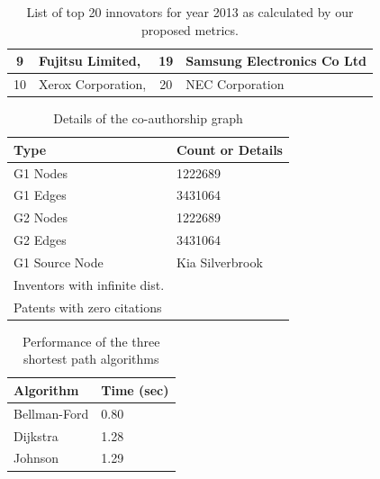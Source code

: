 \begin{table}[t]
\begin{tabular}{clcl}
\multicolumn{1}{|c|}{9}             & \multicolumn{1}{l|}{Fujitsu Limited,}                            & \multicolumn{1}{c|}{19}            & \multicolumn{1}{l|}{Samsung Electronics Co Ltd}                \\ \hline
\multicolumn{1}{|c|}{10}            & \multicolumn{1}{l|}{Xerox Corporation,}                          & \multicolumn{1}{c|}{20}            & \multicolumn{1}{l|}{NEC Corporation}                           \\ \hline                                                               
\end{tabular}
\caption{List of top 20 innovators for year 2013 as calculated by our proposed metrics.}
\label{lst:top20}
\end{table}


\begin{table}[t]
		\begin{tabular}{| l | l |}
		\hline
		
		{Type} & {Count or Details} \\
		\hline
		\hline
		G1 Nodes & 1222689 \\
		G1 Edges & 3431064 \\
		G2 Nodes & 1222689 \\
		G2 Edges & 3431064 \\
		G1 Source Node & Kia Silverbrook \\
		Inventors with infinite dist. & \\
		Patents with zero citations & \\
		\hline
	\end{tabular}		
	\caption {\scriptsize Details of the co-authorship graph}
	\label{tab:model}
\end{table}	

\begin{table}[t]
	\begin{tabular}{| l | l |}
		\hline
		{Algorithm} & {Time (sec)} \\
		\hline
		\hline
		Bellman-Ford & 0.80 \\
		Dijkstra & 1.28 \\
		Johnson & 1.29 \\
		\hline
	\end{tabular}
	\caption {\scriptsize Performance of the three shortest path algorithms}
	\label{tab:algos}
\end{table}					

